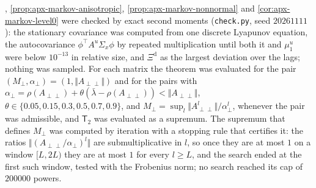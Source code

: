 \begin{numcheck}\label{chk:apx-markov}
, \cref{prop:apx-markov-anisotropic}, \cref{prop:apx-markov-nonnormal} and \cref{cor:apx-markov-level0} were checked by exact second moments (\texttt{check.py}, seed $20261111$): the stationary covariance was computed from one discrete Lyapunov equation, the autocovariance $\phi^\top A^u\Sigma_x\phi$ by repeated multiplication until both it and $\mu_1^u$ were below $10^{-13}$ in relative size, and $\Xi^{\mathrm d}$ as the largest deviation over the lags; nothing was sampled. For each matrix the theorem was evaluated for the pair $(M_\perp,\alpha_\perp)=(1,\Vert A_{\perp\perp}\Vert)$ and for the pairs with $\alpha_\perp=\rho(A_{\perp\perp})+\theta(\bar\lambda-\rho(A_{\perp\perp}))<\Vert A_{\perp\perp}\Vert$, $\theta\in\{0.05,0.15,0.3,0.5,0.7,0.9\}$, and $M_\perp=\sup_l\Vert A_{\perp\perp}^l\Vert/\alpha_\perp^l$, whenever the pair was admissible, and $\mathsf T_2$ was evaluated as a supremum. The supremum that defines $M_\perp$ was computed by iteration with a stopping rule that certifies it: the ratios $\Vert(A_{\perp\perp}/\alpha_\perp)^l\Vert$ are submultiplicative in $l$, so once they are at most $1$ on a window $[L,2L)$ they are at most $1$ for every $l\ge L$, and the search ended at the first such window, tested with the Frobenius norm; no search reached its cap of $200000$ powers.


\end{numcheck}
